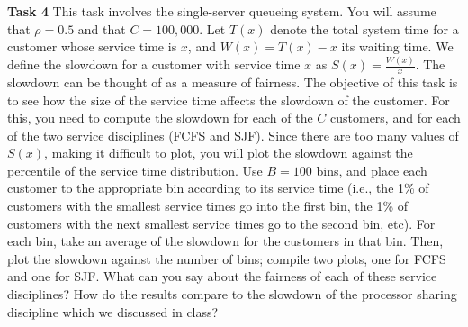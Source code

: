\documentclass{article}
\begin{document}
\textbf{Task 4}
This task involves the single-server queueing system. You will assume that $\rho = 0.5$ and that
$C = 100, 000$. Let $T(x)$ denote the total system time for a customer whose service time is $x$, and $W(x) =
T(x)-x$ its waiting time. We define the slowdown for a customer with service time $x$ as $S(x) = \frac{W(x)}{x}$. The slowdown can be thought of as a measure of fairness. The objective of this task is to see how the size of the service time affects the slowdown of the customer. For this, you need to compute the slowdown for each
of the $C$ customers, and for each of the two service disciplines (FCFS and SJF). Since there are too many
values of $S(x)$, making it difficult to plot, you will plot the slowdown against the percentile of the service
time distribution. Use $B = 100$ bins, and place each customer to the appropriate bin according to its service
time (i.e., the 1\% of customers with the smallest service times go into the first bin, the 1\% of customers with
the next smallest service times go to the second bin, etc). For each bin, take an average of the slowdown for
the customers in that bin. Then, plot the slowdown against the number of bins; compile two plots, one for
FCFS and one for SJF. What can you say about the fairness of each of these service disciplines? How do
the results compare to the slowdown of the processor sharing discipline which we discussed in class?\\
\\
\newcommand{\errorband}[5][]{ %
\pgfplotstableread[col sep=comma, skip first n=2]{#2}\datatable
    \addplot [draw=none, stack plots=y, forget plot] table [
        x={#3},
        y expr=\thisrow{#4}-\thisrow{#5}
    ] {\datatable};

    \addplot [draw=none, fill=gray!40, stack plots=y, area legend, #1] table [
        x={#3},
        y expr=2*\thisrow{#5}
    ] {\datatable} \closedcycle;

    \addplot [forget plot, stack plots=y,draw=none] table [x={#3}, y expr=-(\thisrow{#4}+\thisrow{#5})] {\datatable};
}
\end{document}

